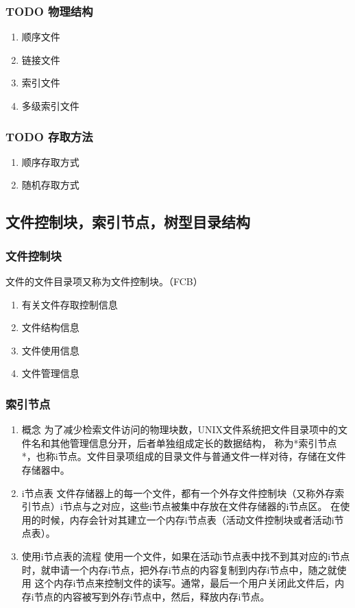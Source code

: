 \documentclass[11pt]{article}
\begin{document}
\subsubsection{{\bfseries\sffamily TODO} 物理结构}
\label{sec-4-2-2}
\begin{enumerate}
\item 顺序文件
\label{sec-4-2-2-1}
\item 链接文件
\label{sec-4-2-2-2}
\item 索引文件
\label{sec-4-2-2-3}
\item 多级索引文件
\label{sec-4-2-2-4}
\end{enumerate}
\subsubsection{{\bfseries\sffamily TODO} 存取方法}
\label{sec-4-2-3}
\begin{enumerate}
\item 顺序存取方式
\label{sec-4-2-3-1}
\item 随机存取方式
\label{sec-4-2-3-2}
\end{enumerate}
\subsection{文件控制块，索引节点，树型目录结构}
\label{sec-4-3}
\subsubsection{文件控制块}
\label{sec-4-3-1}
文件的文件目录项又称为文件控制块。（FCB）
\begin{enumerate}
\item 有关文件存取控制信息
\label{sec-4-3-1-1}
\item 文件结构信息
\label{sec-4-3-1-2}
\item 文件使用信息
\label{sec-4-3-1-3}
\item 文件管理信息
\label{sec-4-3-1-4}
\end{enumerate}
\subsubsection{索引节点}
\label{sec-4-3-2}
\begin{enumerate}
\item 概念
\label{sec-4-3-2-1}
    为了减少检索文件访问的物理块数，UNIX文件系统把文件目录项中的文件名和其他管理信息分开，后者单独组成定长的数据结构， 
称为*索引节点*，也称i节点。文件目录项组成的目录文件与普通文件一样对待，存储在文件存储器中。 
\item i节点表
\label{sec-4-3-2-2}
     文件存储器上的每一个文件，都有一个外存文件控制块（又称外存索引节点）i节点与之对应，这些i节点被集中存放在文件存储器的i节点区。
在使用的时候，内存会针对其建立一个内存i节点表（活动文件控制块或者活动i节点表）。
\item 使用i节点表的流程
\label{sec-4-3-2-3}
     使用一个文件，如果在活动i节点表中找不到其对应的i节点时，就申请一个内存i节点，把外存i节点的内容复制到内存i节点中，随之就使用
这个内存i节点来控制文件的读写。通常，最后一个用户关闭此文件后，内存i节点的内容被写到外存i节点中，然后，释放内存i节点。
\end{enumerate}
\end{document}
